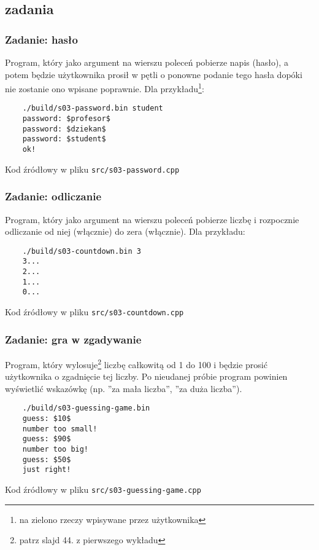 \documentclass[aspectratio=169]{beamer}
\begin{document}
\subsection{zadania}

\begin{frame}[fragile]
    \frametitle{Zadanie: hasło}
    \label{lecture_exercise_0}

    Program, który jako argument na wierszu poleceń pobierze napis (hasło), a
    potem będzie użytkownika prosił w pętli o ponowne podanie tego hasła dopóki
    nie zostanie ono wpisane poprawnie. Dla przykładu\footnote{{\tiny na zielono
    rzeczy wpisywane przez użytkownika}}:

    \begin{lstlisting}
    ./build/s03-password.bin student
    password: $profesor$
    password: $dziekan$
    password: $student$
    ok!
    \end{lstlisting}

    Kod źródłowy w pliku {\tt src/s03-password.cpp}
\end{frame}

\begin{frame}[fragile]
    \frametitle{Zadanie: odliczanie}
    \label{lecture_exercise_1}

    Program, który jako argument na wierszu poleceń pobierze liczbę i rozpocznie
    odliczanie od niej (włącznie) do zera (włącznie). Dla przykładu:

    \begin{lstlisting}
    ./build/s03-countdown.bin 3
    3...
    2...
    1...
    0...
    \end{lstlisting}

    Kod źródłowy w pliku {\tt src/s03-countdown.cpp}
\end{frame}

\begin{frame}[fragile]
    \frametitle{Zadanie: gra w zgadywanie}
    \label{lecture_exercise_2}

    Program, który wylosuje\footnote{patrz slajd 44. z pierwszego wykładu}
    liczbę całkowitą od 1 do 100 i będzie prosić użytkownika o zgadnięcie tej
    liczby. Po nieudanej próbie program powinien wyświetlić wskazówkę (np. ''za
    mała liczba'', ''za duża liczba'').

    \begin{lstlisting}
    ./build/s03-guessing-game.bin
    guess: $10$
    number too small!
    guess: $90$
    number too big!
    guess: $50$
    just right!
    \end{lstlisting}

    Kod źródłowy w pliku {\tt src/s03-guessing-game.cpp}
\end{frame}
\end{document}
